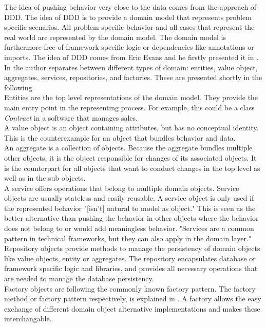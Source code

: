 The idea of pushing behavior very close to the data comes from the approach of \ac{DDD}. The idea of \ac{DDD} is to provide a domain model that represents problem specific scenarios. All problem specific behavior and all cases that represent the real world are represented by the domain model. The domain model is furthermore free of framework specific logic or dependencies like annotations or imports. The idea of \ac{DDD} comes from Eric Evans and he firstly presented it in \cite{dddbook}. 
In \cite{dddbook} the author separates between different types of domain: entities, value object, aggregates, services, repositories, and factories. These are presented shortly in the following. 
\\

Entities are the top level representations of the domain model. They provide the main entry point in the representing process. For example, this could be a class \textit{Contract} in a software that manages sales. 
\\
A value object is an object containing attributes, but has no conceptual identity. This is the counterexample for an object that bundles behavior and data. 
\\
An aggregate is a collection of objects. Because the aggregate bundles multiple other objects, it is the object responsible for changes of its associated objects. It is the counterpart for all objects that want to conduct changes in the top level as well as in the sub objects. 
\\
A service offers operations that belong to multiple domain objects. Service objects are usually stateless and easily reusable. A service object is only used if the represented behavior "[isn't] natural to model as object." \cite[p. 103]{dddbook} This is seen as the better alternative than pushing the behavior in other objects where the behavior does not belong to or would add meaningless behavior. "Services are a common pattern in technical frameworks, but they can also apply in the domain layer." \cite[p. 103]{dddbook}
\\
Repository objects provide methods to manage the persistency of domain objects like value objects, entity or aggregates. The repository encapsulates database or framework specific logic and libraries, and provides all necessary operations that are needed to manage the database persistency.
\\
Factory objects are following the commonly known factory pattern. The factory method or factory pattern respectively, is explained in \cite[p. 121]{gof}. A factory allows the easy exchange of different domain object alternative implementations and makes these interchangable.
